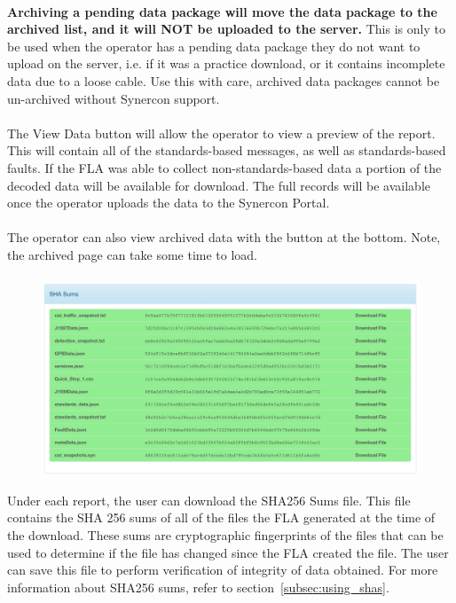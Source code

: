 \documentclass[11pt, oneside]{book}
\begin{document}
\paragraph{  }
\textbf{Archiving a pending data package will move the data package to the archived list, and it will NOT be uploaded to the server.}
This is only to be used when the operator has a pending data package they do not want to upload on the server, i.e. if it was a practice download, or it contains incomplete data due to a loose cable. Use this with care, archived data packages cannot be un-archived without Synercon support.
\paragraph{  }
The View Data button will allow the operator to view a preview of the report. This will contain all of the standards-based messages, as well as standards-based faults. If the FLA was able to collect non-standards-based data a portion of the decoded data will be available for download. The full records will be available once the operator uploads the data to the Synercon Portal.
\paragraph{  }
The operator can also view archived data with the button at the bottom. Note, the archived page can take some time to load.
\paragraph{  }
\begin{figure}
\centering
\includegraphics[width=1\linewidth]{../media/fla_preview_screenshots/sha_sums}
\end{figure}
Under each report, the user can download the SHA256 Sums file.
This file contains the SHA 256 sums of all of the files the FLA generated at the time of the download. These sums are cryptographic fingerprints of the files that can be used to determine if the file has changed since the FLA created the file. The user can save this file to perform verification of integrity of data obtained. For more information about SHA256 sums, refer to section~\ref{subsec:using_shas}.
\end{document}
